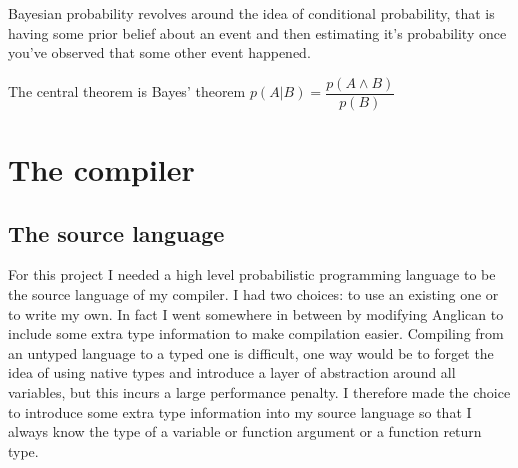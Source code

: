 \documentclass[a4paper]{article}
\begin{document}
Bayesian probability revolves around the idea of conditional probability, that is having some prior belief about an event and then estimating it's probability once you've observed that some other event happened.

The central theorem is Bayes' theorem \(p(A | B) = \dfrac{p(A \land B)}{p(B)}\)




\section{The compiler}




\subsection{The source language}

For this project I needed a high level probabilistic programming language to be the source language of my compiler. I had two choices: to use an existing one or to write my own. In fact I went somewhere in between by modifying Anglican to include some extra type information to make compilation easier. Compiling from an untyped language to a typed one is difficult, one way would be to forget the idea of using native types and introduce a layer of abstraction around all variables, but this incurs a large performance penalty. I therefore made the choice to introduce some extra type information into my source language so that I always know the type of a variable or function argument or a function return type.
\end{document}
